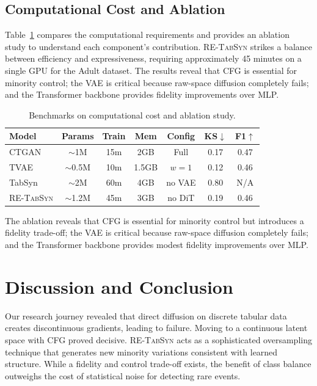 \documentclass[conference]{IEEEtran}
\newcommand{\retabsyn}{\textsc{RE-TabSyn}}
\begin{document}
\subsection{Computational Cost and Ablation}
Table~\ref{tab:combined} compares the computational requirements and provides an ablation study to understand each component's contribution. \retabsyn{} strikes a balance between efficiency and expressiveness, requiring approximately 45 minutes on a single GPU for the Adult dataset. The results reveal that CFG is essential for minority control; the VAE is critical because raw-space diffusion completely fails; and the Transformer backbone provides fidelity improvements over MLP.

\begin{table}[htbp]
\caption{Benchmarks on computational cost and ablation study.}
\label{tab:combined}
\centering
\footnotesize
\begin{tabular}{lccc|ccc}
\toprule
\textbf{Model} & \textbf{Params} & \textbf{Train} & \textbf{Mem} & \textbf{Config} & \textbf{KS$\downarrow$} & \textbf{F1$\uparrow$} \\
\midrule
CTGAN & $\sim$1M & 15m & 2GB & Full & 0.17 & 0.47 \\
TVAE & $\sim$0.5M & 10m & 1.5GB & $w=1$ & 0.12 & 0.46 \\
TabSyn & $\sim$2M & 60m & 4GB & no VAE & 0.80 & N/A \\
\retabsyn{} & $\sim$1.2M & 45m & 3GB & no DiT & 0.19 & 0.46 \\
\bottomrule
\end{tabular}
\end{table}

The ablation reveals that CFG is essential for minority control but introduces a fidelity trade-off; the VAE is critical because raw-space diffusion completely fails; and the Transformer backbone provides modest fidelity improvements over MLP.

\section{Discussion and Conclusion}
\vspace{-1mm}
Our research journey revealed that direct diffusion on discrete tabular data creates discontinuous gradients, leading to failure. Moving to a continuous latent space with CFG proved decisive. \retabsyn{} acts as a sophisticated oversampling technique that generates new minority variations consistent with learned structure. While a fidelity and control trade-off exists, the benefit of class balance outweighs the cost of statistical noise for detecting rare events.
\end{document}
